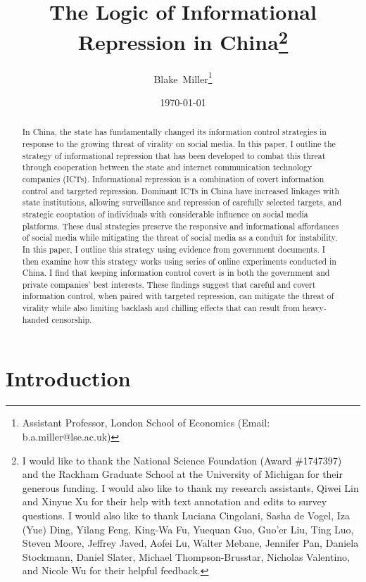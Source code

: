 \documentclass[11pt]{article}
\title{The Logic of Informational Repression in China\thanks{\normalsize I would like to thank the National Science Foundation (Award \#1747397) and the Rackham Graduate School at the University of Michigan for their generous funding. I would also like to thank my research assistants, Qiwei Lin and Xinyue Xu for their help with text annotation and edits to survey questions. I would also like to thank Luciana Cingolani, Sasha de Vogel, Iza (Yue) Ding, Yilang Feng, King-Wa Fu, Yuequan Guo, Guo'er Liu, Ting Luo, Steven Moore, Jeffrey Javed, Aofei Lu, Walter Mebane, Jennifer Pan, Daniela Stockmann, Daniel Slater, Michael Thompson-Brusstar, Nicholas Valentino, and Nicole Wu for their helpful feedback.}\\ \large }
\author{Blake\ Miller\thanks{\normalsize{Assistant Professor, London School of Economics} (Email: \mbox{b.a.miller@lse.ac.uk})}}
\date{\today}
\begin{document}
\maketitle

\begin{abstract}
\begin{normalsize}
In China, the state has fundamentally changed its information control strategies in response to the growing threat of virality on social media. In this paper, I outline the strategy of informational repression that has been developed to combat this threat through cooperation between the state and internet communication technology companies (ICTs). Informational repression is a combination of covert information control and targeted repression. Dominant ICTs in China have increased linkages with state institutions, allowing surveillance and repression of carefully selected targets, and strategic cooptation of individuals with considerable influence on social media platforms. These dual strategies preserve the responsive and informational affordances of social media while mitigating the threat of social media as a conduit for instability. In this paper, I outline this strategy using evidence from government documents. I then examine how this strategy works using series of online experiments conducted in China. I find that keeping information control covert is in both the government and private companies’ best interests. These findings suggest that careful and covert information control, when paired with targeted repression, can mitigate the threat of virality while also limiting backlash and chilling effects that can result from heavy-handed censorship.
\end{normalsize}
\end{abstract}
\doublespacing

\section*{Introduction}
\end{document}
